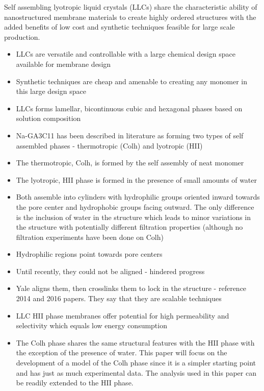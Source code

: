 Self assembling lyotropic liquid crystals (LLCs) share the characteristic
ability of nanostructured membrane materials to create highly ordered 
structures with the added benefits of low cost and synthetic techniques
feasible for large scale production.
\begin{itemize}
	\item LLCs are versatile and controllable with a large chemical design space available for membrane design
	\item Synthetic techniques are cheap and amenable to creating any monomer in this large design space
	\item LLCs forms lamellar, bicontinuous cubic and hexagonal phases based on solution composition
	\item Na-GA3C11 has been described in literature as forming two types of self assembled phases - thermotropic (Colh) and lyotropic (HII)
	\item The thermotropic, Colh, is formed by the self assembly of neat monomer
	\item The lyotropic, HII phase is formed in the presence of small amounts of water
	\item Both assemble into cylinders with hydrophilic groups oriented inward towards the pore center and hydrophobic groups facing outward. The only difference is the inclusion of water in the structure which leads to minor variations in the structure with potentially different filtration properties (although no filtration experiments have been done on Colh)  
	\item Hydrophilic regions point towards pore centers
	\item Until recently, they could not be aligned - hindered progress
	\item Yale aligns them, then crosslinks them to lock in the structure - reference 2014 and 2016 papers. They say that they are scalable techniques
	\item LLC HII phase membranes offer potential for high permeability and selectivity which equals low energy consumption
	\item The Colh phase shares the same structural features with the HII phase with the exception of the presence of water. This paper will focus on the development of a model of the Colh phase since it is a simpler starting point and has just as much experimental data. The analysis used in this paper can be readily extended to the HII phase. 
\end{itemize}
	
